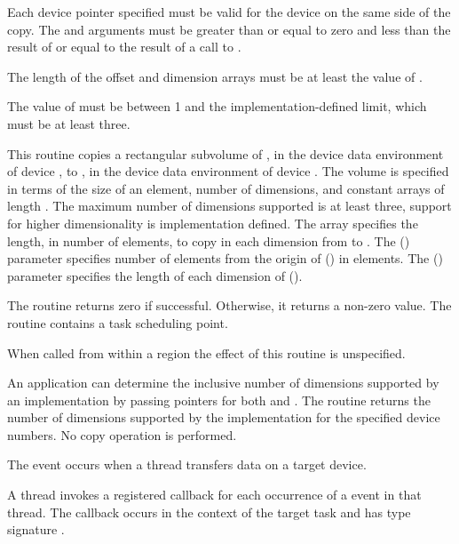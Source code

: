 \constraints
Each device pointer specified must be valid for the device on the same side
of the copy. The  and
 arguments must be greater than or equal to zero and
less than the result of  or equal to
the result of a call to .

The length of the offset and dimension arrays must be at least the
value of .

The value of  must be between 1 and the implementation-defined
limit, which must be at least three.


\effect
This routine copies a rectangular subvolume of ,
in the device data environment of device ,
to , in the device data environment of device .
The volume is specified in terms of the size of an element,
number of dimensions, and constant arrays of length .  The
maximum number of dimensions supported is at least three, support for higher
dimensionality is implementation defined. The  array specifies the
length, in number of elements, to copy in each dimension from 
to . The  () parameter specifies
number of elements from the origin of  () in elements.
The  () parameter specifies the
length of each dimension of  ().

The routine returns zero if successful.
Otherwise, it returns a non-zero value. The
routine contains a task scheduling point.

When called from within a  region
the effect of this routine is unspecified.

An application can determine the inclusive number of dimensions supported by an implementation by passing  pointers for both  and .
The routine returns the number of dimensions supported
by the implementation for the specified device numbers.
No copy operation is performed.

\events
The  event occurs when a thread transfers data on a target device.

\tools

A thread invokes a registered 
callback for each occurrence of a  event in that
thread. The callback occurs in the context of the target task and
has type signature .

